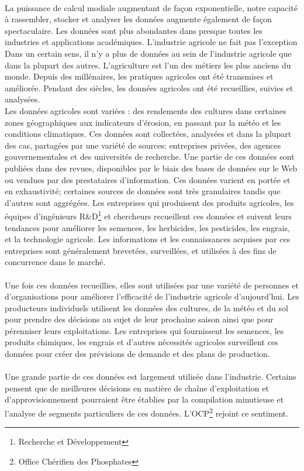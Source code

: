 \paragraph{}
La puissance de calcul modiale augmentant de façon exponentielle, notre capacité à rassembler, stocker et analyser les données augmente également de façon spectaculaire. Les données sont plus abondantes dans presque toutes les industries et applications académiques. L'industrie agricole ne fait pas l'exception Dans un certain sens, il n'y a plus de données au sein de l'industrie agricole que dans la plupart des autres. L'agriculture est l'un des métiers les plus anciens du monde. Depuis des millénaires, les pratiques agricoles ont été transmises et améliorée. Pendant des siècles, les données agricoles ont été recueillies, suivies et analysées\cite{MIT-BIGDATA}.\\
Les données agricoles sont variées : des rendements des cultures dans certaines zones géographiques aux indicateurs d'érosion, en passant par la météo et les conditions climatiques. Ces données sont collectées, analysées et dans la plupart des cas, partagées par une variété de sources: entreprises privées, des agences gouvernementales et des universités de recherche. Une partie de ces données sont publiées dans des revues, disponibles par le biais des bases de données sur le Web ou vendues par des prestataires d'information. Ces données varient en portée et en exhaustivité; certaines sources de données sont très granulaires tandis que d'autres sont aggrégées.
Les entreprises qui produisent des produits agricoles, les équipes d'ingénieurs R\&D\footnote{Recherche et Développement} et chercheurs recueillent ces données et suivent leurs tendances pour améliorer les semences, les herbicides, les pesticides, les engrais, et la technologie agricole. Les informations et les connaissances acquises par ces entreprises sont généralement brevetées, surveillées, et utilisées à des fins de concurrence dans le marché. 
\paragraph{}
Une fois ces données recueillies, elles sont utilisées par une variété de personnes et d'organisations pour améliorer l'efficacité de l'industrie agricole d'aujourd'hui. Les producteurs individuels utilisent les données des cultures, de la météo et du sol pour prendre des décisions au sujet de leur prochaine saison ainsi que pour pérenniser leurs exploitations. Les entreprises qui fournissent les semences, les produits chimiques, les engrais et d'autres nécessités agricoles surveillent ces données pour créer des prévisions de demande et des plans de production.
\paragraph{} 
Une grande partie de ces données est largement utilisée dans l'industrie. Certains pensent que de meilleures décisions en matière de chaîne d'exploitation et d'approvisionnement pourraient être établies par la compilation minutieuse et l'analyse de segments particuliers de ces données. L'OCP\footnote{Office Chérifien des Phosphates} rejoint ce sentiment.